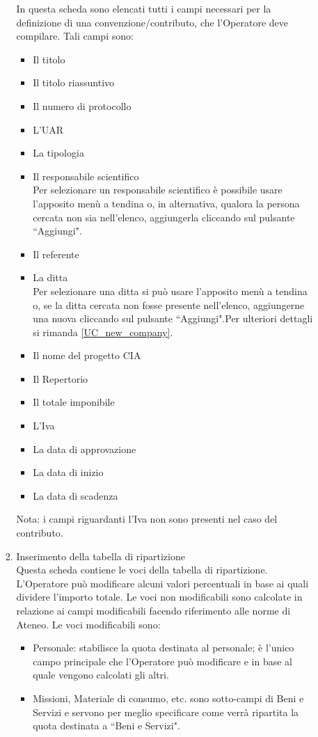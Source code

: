 \begin{enumerate}
\begin{enumerate}
\begin{enumerate}
      In questa scheda sono elencati tutti i campi necessari per la definizione di una convenzione/contributo, 
      che l'Operatore deve compilare. Tali campi sono:
      \begin{itemize}
	\item Il titolo
	\item Il titolo riassuntivo
	\item Il numero di protocollo
	\item L'UAR
	\item La tipologia
	\item Il responsabile scientifico\\
	  Per selezionare un responsabile scientifico è possibile usare l'apposito menù a tendina o, in alternativa, qualora la persona cercata non sia nell'elenco, aggiungerla cliccando sul pulsante ``Aggiungi".
	\item Il referente
	\item La ditta\\
	  Per selezionare una ditta si può usare l'apposito menù a tendina o, se la ditta cercata non fosse presente nell'elenco, aggiungerne una nuova cliccando sul pulsante ``Aggiungi".Per ulteriori dettagli si rimanda \ref{UC_new_company}.
	\item Il nome del progetto CIA
	\item Il Repertorio
	\item Il totale imponibile
	\item L'Iva
	\item La data di approvazione
	\item La data di inizio
	\item La data di scadenza
      \end{itemize}
      
      Nota: i campi riguardanti l'Iva non sono presenti nel caso del contributo.
      
    \item Inserimento della tabella di ripartizione\\
     
      Questa scheda contiene le voci della tabella di ripartizione. L'Operatore può modificare alcuni valori percentuali 
      in base ai quali dividere l'importo totale. Le voci non modificabili sono calcolate in relazione ai campi modificabili facendo riferimento alle norme di Ateneo. Le voci modificabili sono:
      \begin{itemize}
	\item Personale: stabilisce la quota destinata al personale; è l'unico campo principale che l'Operatore può modificare e in base al quale vengono calcolati gli altri.
	\item Missioni, Materiale di consumo, etc. sono sotto-campi di Beni e Servizi e servono per meglio specificare come verrà ripartita la quota destinata a ``Beni e Servizi".
      \end{itemize}
      

\end{enumerate}
\end{enumerate}
\end{enumerate}
